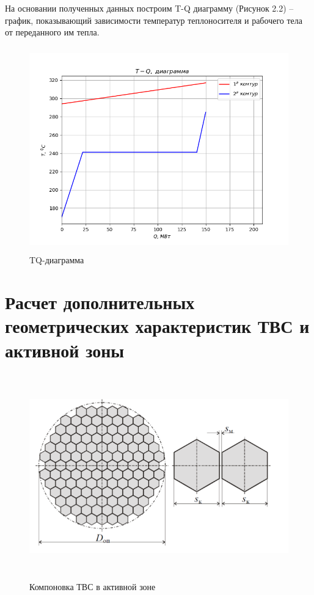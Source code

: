 На основании полученных данных построим T-Q диаграмму (Рисунок 2.2) --
график, показывающий зависимости температур теплоносителя и рабочего
тела от переданного им тепла.

\begin{figure}[!h]
\center
\includegraphics[width=4.56942in,height=3.48958in]{media/image7.png}
\caption{TQ-диаграмма}
\end{figure}

\section{Расчет дополнительных геометрических характеристик ТВС и
активной зоны}

\begin{figure}[!h]
\center
\includegraphics[width=4.56942in,height=3.48958in]{media/image8.png}
\caption{Компоновка ТВС в активной зоне \cite{deev}}
\end{figure}

